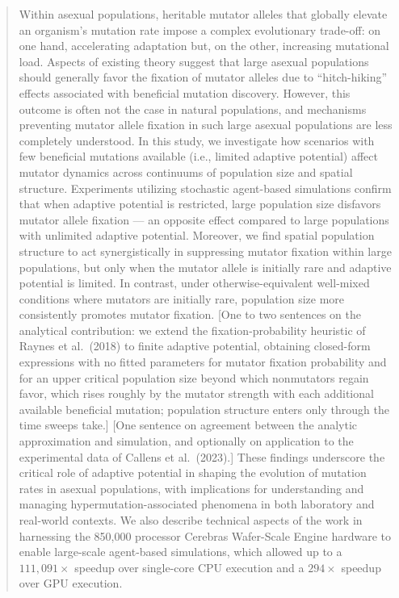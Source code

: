 \begin{abstract}
Within asexual populations, heritable mutator alleles that globally elevate an organism's mutation rate impose a complex evolutionary trade-off: on one hand, accelerating adaptation but, on the other, increasing mutational load.
Aspects of existing theory suggest that large asexual populations should generally favor the fixation of mutator alleles due to ``hitch-hiking'' effects associated with beneficial mutation discovery.
However, this outcome is often not the case in natural populations, and mechanisms preventing mutator allele fixation in such large asexual populations are less completely understood.
In this study, we investigate how scenarios with few beneficial mutations available (i.e., limited adaptive potential) affect mutator dynamics across continuums of population size and spatial structure.
Experiments utilizing stochastic agent-based simulations confirm that when adaptive potential is restricted, large population size disfavors mutator allele fixation --- an opposite effect compared to large populations with unlimited adaptive potential.
Moreover, we find spatial population structure to act synergistically in suppressing mutator fixation within large populations, but only when the mutator allele is initially rare and adaptive potential is limited.
In contrast, under otherwise-equivalent well-mixed conditions where mutators are initially rare, population size more consistently promotes mutator fixation.
[One to two sentences on the analytical contribution: we extend the fixation-probability heuristic of Raynes et al.\ (2018) to finite adaptive potential, obtaining closed-form expressions with no fitted parameters for mutator fixation probability and for an upper critical population size beyond which nonmutators regain favor, which rises roughly by the mutator strength with each additional available beneficial mutation; population structure enters only through the time sweeps take.]
[One sentence on agreement between the analytic approximation and simulation, and optionally on application to the experimental data of Callens et al.\ (2023).]
These findings underscore the critical role of adaptive potential in shaping the evolution of mutation rates in asexual populations, with implications for understanding and managing hypermutation-associated phenomena in both laboratory and real-world contexts.
We also describe technical aspects of the work in harnessing the 850,000 processor Cerebras Wafer-Scale Engine hardware to enable large-scale agent-based simulations, which allowed up to a $111{,}091\times$ speedup over single-core CPU execution and a $294\times$ speedup over GPU execution.
\end{abstract}
